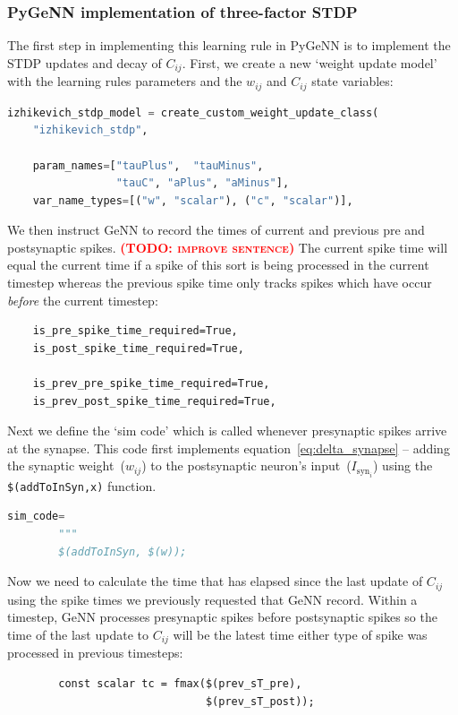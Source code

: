 \documentclass[utf8]{frontiersSCNS} %
\newcommand{\todo}[1]{\textbf{\textsc{\textcolor{red}{(TODO: #1)}}}}
\begin{document}
\subsubsection{PyGeNN implementation of three-factor STDP}
The first step in implementing this learning rule in PyGeNN is to implement the STDP updates and decay of $C_{ij}$.
First, we create a new `weight update model' with the learning rules parameters and the $w_{ij}$ and $C_{ij}$ state variables:
%
\begin{lstlisting}[language=python]
izhikevich_stdp_model = create_custom_weight_update_class(
    "izhikevich_stdp",
    
    param_names=["tauPlus",  "tauMinus", 
                 "tauC", "aPlus", "aMinus"],
    var_name_types=[("w", "scalar"), ("c", "scalar")],
\end{lstlisting}
%
We then instruct GeNN to record the times of current and previous pre and postsynaptic spikes.
\todo{improve sentence}
The current spike time will equal the current time if a spike of this sort is being processed in the current timestep whereas the previous spike time only tracks spikes which have occur \emph{before} the current timestep:
%
\begin{lstlisting}
    is_pre_spike_time_required=True,
    is_post_spike_time_required=True,
    
    is_prev_pre_spike_time_required=True,
    is_prev_post_spike_time_required=True,
\end{lstlisting}
%
Next we define the `sim code' which is called whenever presynaptic spikes arrive at the synapse.
This code first implements equation~\ref{eq:delta_synapse} -- adding the synaptic weight~($w_{ij}$) to the postsynaptic neuron's input~($I_{\text{syn}_{i}}$) using the \lstinline{$(addToInSyn,x)} function.
%
\begin{lstlisting}[language=python]
    sim_code=
        """
        $(addToInSyn, $(w));
\end{lstlisting}
%
Now we need to calculate the time that has elapsed since the last update of $C_{ij}$ using the spike times we previously requested that GeNN record.
Within a timestep, GeNN processes presynaptic spikes before postsynaptic spikes so the time of the last update to $C_{ij}$ will be the latest time either type of spike was processed in previous timesteps:
%
\begin{lstlisting}
        const scalar tc = fmax($(prev_sT_pre), 
                               $(prev_sT_post));
\end{lstlisting}
%
\end{document}
